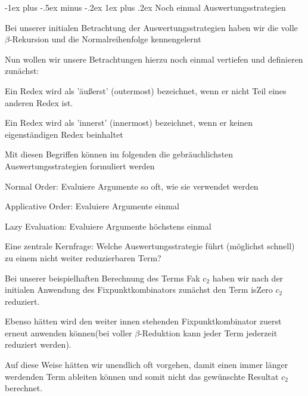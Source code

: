 \documentclass[10pt]{article}
\makeatletter
\renewcommand{\subsubsection}{\@startsection{subsubsection}{3}{0mm}%
                                {-1ex plus -.5ex minus -.2ex}%
                                {1ex plus .2ex}%
                                {\normalfont\small\bfseries}}
\makeatother
\begin{document}
\subsubsection{Noch einmal Auswertungsstrategien}
\begin{itemize*}
  \item Bei unserer initialen Betrachtung der Auswertungsstrategien haben wir die volle $\beta$-Rekursion und die Normalreihenfolge kennengelernt
  \item Nun wollen wir unsere Betrachtungen hierzu noch einmal vertiefen und definieren zunächst:
  \begin{itemize*}
    \item Ein Redex wird als \color{blue} 'äußerst' (outermost) \color{black} bezeichnet, wenn er nicht Teil eines anderen Redex ist.
    \item Ein Redex wird als \color{blue} 'innerst' (innermost) \color{black} bezeichnet, wenn er keinen eigenständigen Redex beinhaltet
  \end{itemize*}
  \item Mit diesen Begriffen können im folgenden die gebräuchlichsten Auswertungsstrategien formuliert werden
  \begin{itemize*}
    \item \color{blue} Normal Order: \color{black} Evaluiere Argumente so oft, wie sie verwendet werden
    \item \color{blue} Applicative Order: \color{black} Evaluiere Argumente einmal
    \item \color{blue} Lazy Evaluation: \color{black} Evaluiere Argumente höchstens einmal
  \end{itemize*}
  \item Eine zentrale Kernfrage: \color{blue} Welche Auswertungsstrategie führt (möglichst schnell) zu einem nicht weiter reduzierbaren Term?
  \color{black}
  \begin{itemize*}
    \item Bei unserer beispielhaften Berechnung des Terms Fak $c_2$ haben wir nach der initialen Anwendung des Fixpunktkombinators zunächst den Term isZero $c_2$ reduziert.
    \item Ebenso hätten wird den weiter innen stehenden Fixpunktkombinator zuerst erneut anwenden können(bei voller $\beta$-Reduktion kann jeder Term jederzeit reduziert werden).
    \item Auf diese Weise hätten wir unendlich oft vorgehen, damit einen immer länger werdenden Term ableiten können und somit nicht das gewünschte Resultat $c_2$ berechnet.

\end{itemize*}
\end{itemize*}
\end{document}
